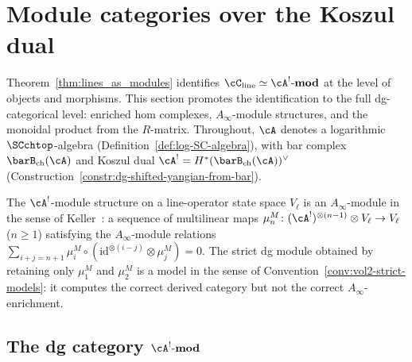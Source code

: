 
\section{Module categories over the Koszul dual}

Theorem~\ref{thm:lines_as_modules} identifies
$\cC_{\mathrm{line}}\simeq\cA^!\text{-}\mathbf{mod}$
at the level of objects and morphisms. This section
promotes the identification to the full dg-categorical
level: enriched hom complexes, $A_\infty$-module structures,
and the monoidal product from the $R$-matrix.
Throughout, $\cA$ denotes a logarithmic $\SCchtop$-algebra
(Definition~\ref{def:log-SC-algebra}), with bar complex
$\barB_{\mathrm{ch}}(\cA)$ and Koszul dual
$\cA^!=H^*(\barB_{\mathrm{ch}}(\cA))^\vee$
(Construction~\ref{constr:dg-shifted-yangian-from-bar}).

\begin{remark}
The $\cA^!$-module structure on a line-operator state space
$V_\ell$ is an $A_\infty$-module in the sense of
Keller~\cite{Kel06}: a sequence of multilinear maps
$\mu_n^M\colon(\cA^!)^{\otimes(n-1)}\otimes V_\ell\to V_\ell$
($n\ge 1$) satisfying the $A_\infty$-module relations
$\sum_{i+j=n+1}\mu_i^M\circ(\mathrm{id}^{\otimes(i-j)}\otimes\mu_j^M)=0$.
The strict dg module obtained by retaining only $\mu_1^M$ and
$\mu_2^M$ is a model in the sense of
Convention~\ref{conv:vol2-strict-models}: it computes the
correct derived category but not the correct $A_\infty$-enrichment.
\end{remark}

\subsection{The dg category $\cA^!\text{-}\mathbf{mod}$}


